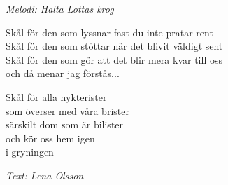 {\footnotesize\textit{Melodi: Halta Lottas krog}}\par
\vspace{10pt}
Skål för den som lyssnar fast du inte pratar rent\\
Skål för den som stöttar när det blivit väldigt sent\\
Skål för den som gör att det blir mera kvar till oss\\
och då menar jag förstås...\par
\vspace{10pt}
Skål för alla nykterister\\
som överser med våra brister\\
särskilt dom som är bilister\\
och kör oss hem igen\\
i gryningen\par
\vspace{10pt}
{\footnotesize\textit{Text: Lena Olsson}}
